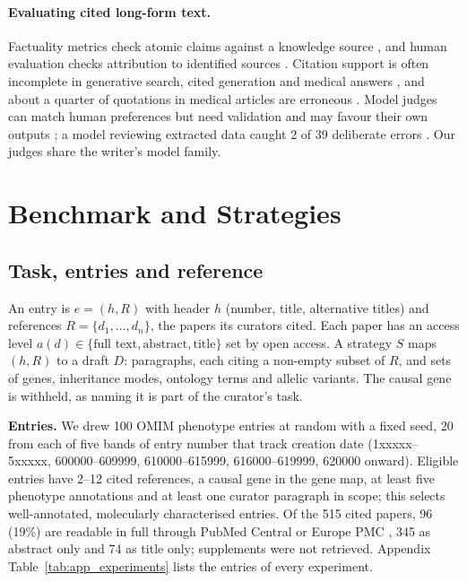 \documentclass{article} %
\begin{document}
\paragraph{Evaluating cited long-form text.}
Factuality metrics check atomic claims against a knowledge source \citep{min2023factscore,wei2024longform,Song2024VeriscoreEvaluating}, and human evaluation checks attribution to identified sources \citep{Rashkin2021MeasuringAttribution}. Citation support is often incomplete in generative search, cited generation and medical answers \citep{Liu2023EvaluatingVerifiability,gao2023enabling,wu2025automated}, and about a quarter of quotations in medical articles are erroneous \citep{jergas2015quotation}. Model judges can match human preferences \citep{zheng2023judging} but need validation \citep{shankar2024who} and may favour their own outputs \citep{panickssery2024llm}; a model reviewing extracted data caught 2 of 39 deliberate errors \citep{Stewartevans2025ExpeditingData}. Our judges share the writer's model family.

\section{Benchmark and Strategies}
\label{sec:method}
\subsection{Task, entries and reference}
\label{sec:task}
An entry is $e=(h,R)$ with header $h$ (number, title, alternative titles) and references $R=\{d_1,\dots,d_n\}$, the papers its curators cited. Each paper has an access level $a(d)\in\{\text{full text},\text{abstract},\text{title}\}$ set by open access. A strategy $S$ maps $(h,R)$ to a draft $D$: paragraphs, each citing a non-empty subset of $R$, and sets of genes, inheritance modes, ontology terms and allelic variants. The causal gene is withheld, as naming it is part of the curator's task.

\textbf{Entries.} We drew 100 OMIM phenotype entries at random with a fixed seed, 20 from each of five bands of entry number that track creation date (1xxxxx--5xxxxx, 600000--609999, 610000--615999, 616000--619999, 620000 onward). Eligible entries have 2--12 cited references, a causal gene in the gene map, at least five phenotype annotations and at least one curator paragraph in scope; this selects well-annotated, molecularly characterised entries. Of the 515 cited papers, 96 (19\%) are readable in full through PubMed Central or Europe PMC \citep{rosonovski2024europe}, 345 as abstract only and 74 as title only; supplements were not retrieved. Appendix Table~\ref{tab:app_experiments} lists the entries of every experiment.
\end{document}
